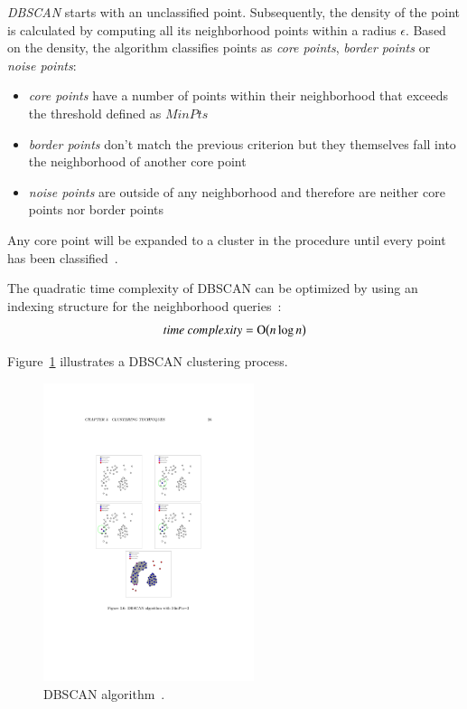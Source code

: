 \textit{DBSCAN} starts with an unclassified point. Subsequently, the density of the point is calculated by computing all its neighborhood points within a radius $\epsilon$. Based on the density, the algorithm classifies points as \textit{core points}, \textit{border points} or \textit{noise points}:

\begin{itemize}
\item \textit{core points} have a number of points within their neighborhood that exceeds the threshold defined as $MinPts$
\item \textit{border points} don't match the previous criterion but they themselves fall into the neighborhood of another core point
\item \textit{noise points} are outside of any neighborhood and therefore are neither core points nor border points
\end{itemize}

Any core point will be expanded to a cluster in the procedure until every point has been classified~\cite{Varlaro08spatial, Meert06clustermaps}.

The quadratic time complexity of DBSCAN  can be optimized by using an indexing structure for the neighborhood queries~\cite{wiki:DBSCAN}:
\[time~complexity = \operatorname{O}\bigl(n \log{n} \bigr)\]

Figure~\ref{fig:clustering-dbscan} illustrates a DBSCAN clustering process.

\begin{figure}[h]
  \begin{center}
    \includegraphics[width=0.55\textwidth]{figures/clustering_dbscan.pdf}
    \caption{DBSCAN algorithm~\cite[p 26]{Meert06clustermaps}.}
    \label{fig:clustering-dbscan}
  \end{center}
\end{figure}

